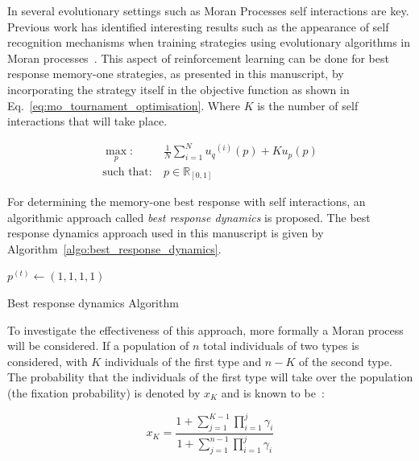 \documentclass[10pt]{article}
\newcommand{\R}{\mathbb{R}}
\begin{document}
In several evolutionary settings
such as Moran Processes self interactions are key. Previous work has
identified interesting results such as the appearance of self recognition
mechanisms when training strategies using evolutionary algorithms in Moran
processes~\cite{Knight2018}. This aspect of reinforcement learning can be done for
best response memory-one strategies, as presented in this manuscript, by incorporating the strategy itself in the
objective function as shown in Eq.~\ref{eq:mo_tournament_optimisation}.
Where \(K\) is the number of self interactions that will take place.

\begin{equation}\label{eq:mo_evolutionary_optimisation}
\begin{aligned}
\max_p: & \ \frac{1}{N} \sum\limits_{i=1} ^ {N} {u_q}^{(i)} (p) + Ku_p(p)
\\
\text{such that}: & \ p \in \R_{[0, 1]}
\end{aligned}
\end{equation}

For determining the memory-one best response with self interactions, an
algorithmic approach called \textit{best response dynamics} is proposed. The
best response dynamics approach used in this manuscript is given by
Algorithm~\ref{algo:best_response_dynamics}.

\begin{center}
\begin{minipage}{.55\textwidth}
\begin{algorithm}[H]
       $p^{(t)}\leftarrow (1, 1, 1, 1)$\;
       \caption{Best response dynamics Algorithm}
       \label{algo:best_response_dynamics}
\end{algorithm}
\end{minipage}
\end{center}

To investigate the effectiveness of this approach, more formally a Moran process
will be considered. If a population of \(n\) total individuals of two types is
considered, with \(K\) individuals of the first type and \(n-K\) of the second
type.
The probability that the individuals of the first type will take over the
population (the fixation probability) is denoted by \(x_K\) and is known to
be~\cite{nowak2006evolutionary}:

\[ x_K = \frac{ 1 + \sum_{j=1}^{K-1}\prod_{i=1}^j\gamma_i }{ 1 +
\sum_{j=1}^{n-1}\prod_{i=1}^j\gamma_i } \]
\end{document}

